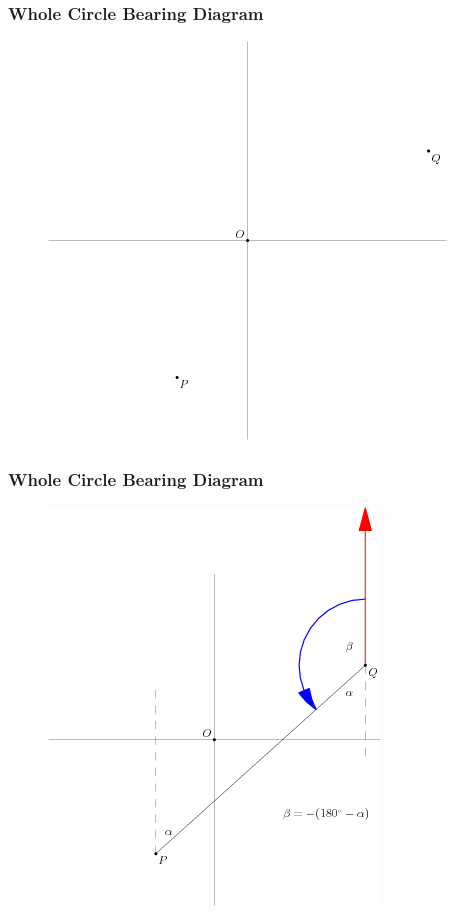 \documentclass[xcolor=dvipsnames]{beamer}
\begin{document}
\begin{frame}
  \frametitle{Whole Circle Bearing Diagram}
  \begin{figure}[h]
    \includegraphics[scale=.6]{./wcbc.png}
  \end{figure}
\end{frame}

\begin{frame}
  \frametitle{Whole Circle Bearing Diagram}
  \begin{figure}[h]
    \includegraphics[scale=.6]{./wcca.png}
  \end{figure}
\end{frame}
\end{document}
